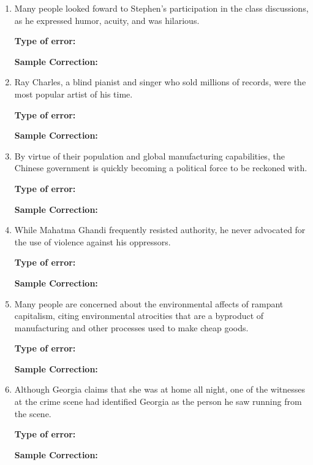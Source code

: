 \documentclass[12pt]{book}
\begin{document}
\begin{enumerate}
\item Many people looked foward to Stephen's participation in the class discussions, as he expressed humor, acuity, and was hilarious. 

\bigskip
\textbf{Type of error:} \hrulefill

\textbf{Sample Correction:} \hrulefill 

\item Ray Charles, a blind pianist and singer who sold millions of records, were the most popular artist of his time.

\bigskip
\textbf{Type of error:} \hrulefill

\textbf{Sample Correction:} \hrulefill 



\item By virtue of their population and global manufacturing capabilities, the Chinese government is quickly becoming a political force to be reckoned with. 

\bigskip
\textbf{Type of error:} \hrulefill

\textbf{Sample Correction:} \hrulefill 


\item While Mahatma Ghandi frequently resisted authority, he never advocated for the use of violence against his oppressors. 

\bigskip
\textbf{Type of error:} \hrulefill

\textbf{Sample Correction:} \hrulefill 


\item Many people are concerned about the environmental affects of rampant capitalism, citing environmental atrocities that are a byproduct of manufacturing and other processes used to make cheap goods. 

\bigskip
\textbf{Type of error:} \hrulefill

\textbf{Sample Correction:} \hrulefill 

\item Although Georgia claims that she was at home all night, one of the witnesses at the crime scene had identified Georgia as the person he saw running from the scene. 

\bigskip
\textbf{Type of error:} \hrulefill

\textbf{Sample Correction:} \hrulefill 

\end{enumerate}
\end{document}
